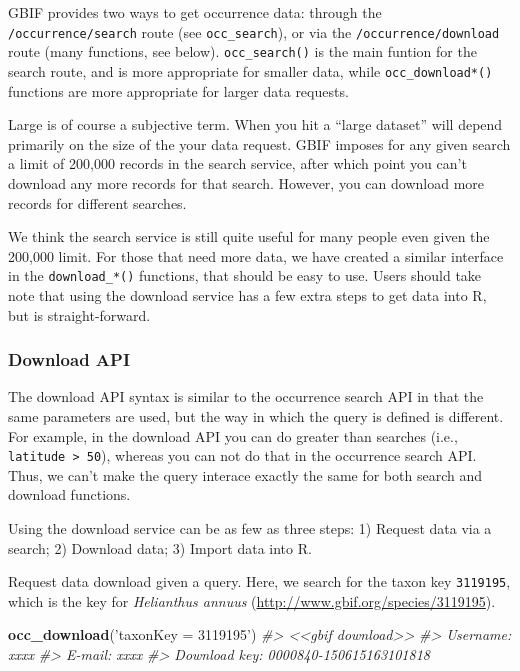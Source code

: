\documentclass[author-year, review, 11pt]{components/elsarticle} %
\newenvironment{Shaded}{\begin{snugshade}}{\end{snugshade}}
\newcommand{\KeywordTok}[1]{\textcolor[rgb]{0.13,0.29,0.53}{\textbf{{#1}}}}
\newcommand{\StringTok}[1]{\textcolor[rgb]{0.31,0.60,0.02}{{#1}}}
\newcommand{\CommentTok}[1]{\textcolor[rgb]{0.56,0.35,0.01}{\textit{{#1}}}}
\newcommand{\NormalTok}[1]{{#1}}
\begin{document}
GBIF provides two ways to get occurrence data: through the
\texttt{/occurrence/search} route (see \texttt{occ\_search}), or via the
\texttt{/occurrence/download} route (many functions, see below).
\texttt{occ\_search()} is the main funtion for the search route, and is
more appropriate for smaller data, while \texttt{occ\_download*()}
functions are more appropriate for larger data requests.

Large is of course a subjective term. When you hit a ``large dataset''
will depend primarily on the size of the your data request. GBIF imposes
for any given search a limit of 200,000 records in the search service,
after which point you can't download any more records for that search.
However, you can download more records for different searches.

We think the search service is still quite useful for many people even
given the 200,000 limit. For those that need more data, we have created
a similar interface in the \texttt{download\_*()} functions, that should
be easy to use. Users should take note that using the download service
has a few extra steps to get data into R, but is straight-forward.

\subsubsection{Download API}\label{download-api}

The download API syntax is similar to the occurrence search API in that
the same parameters are used, but the way in which the query is defined
is different. For example, in the download API you can do greater than
searches (i.e., \texttt{latitude \textgreater{} 50}), whereas you can
not do that in the occurrence search API. Thus, we can't make the query
interace exactly the same for both search and download functions.

Using the download service can be as few as three steps: 1) Request data
via a search; 2) Download data; 3) Import data into R.

Request data download given a query. Here, we search for the taxon key
\texttt{3119195}, which is the key for \emph{Helianthus annuus}
(\url{http://www.gbif.org/species/3119195}).

\begin{Shaded}
\begin{Highlighting}[]
\KeywordTok{occ_download}\NormalTok{(}\StringTok{'taxonKey = 3119195'}\NormalTok{)}
\CommentTok{#> <<gbif download>>}
\CommentTok{#>   Username: xxxx}
\CommentTok{#>   E-mail: xxxx}
\CommentTok{#>   Download key: 0000840-150615163101818}
\end{Highlighting}
\end{Shaded}
\end{document}
